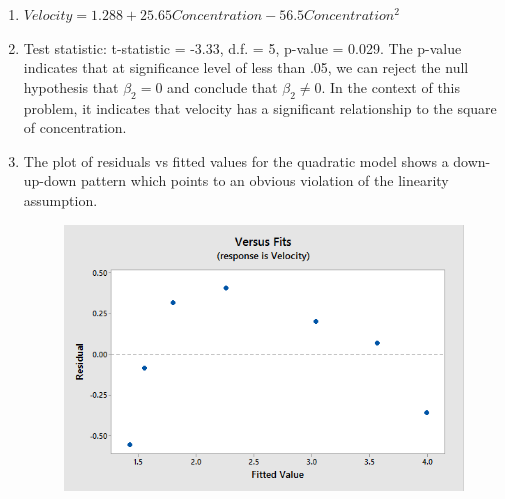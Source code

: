 \documentclass{article}
\begin{document}
\begin{enumerate}
\def\labelenumi{\alph{enumi})}
\item
  \(Velocity = 1.288 + 25.65 Concentration - 56.5 Concentration^2\)
\item
  Test statistic: t-statistic = -3.33, d.f. = 5, p-value = 0.029. The
  p-value indicates that at significance level of less than .05, we can
  reject the null hypothesis that \(\beta_2 = 0\) and conclude that
  \(\beta_2 \ne 0\). In the context of this problem, it indicates that
  velocity has a significant relationship to the square of
  concentration.
\item
The plot of residuals vs fitted values for the quadratic model shows a
down-up-down pattern which points to an obvious violation of the
linearity assumption.

\begin{figure}[h!]
 \centering
 \includegraphics[scale=.5]{./images/scatterplot_residuals-vs-fitted_velocity-vs-concentration-quadratic.png}
\end{figure}

\end{enumerate}
\end{document}
